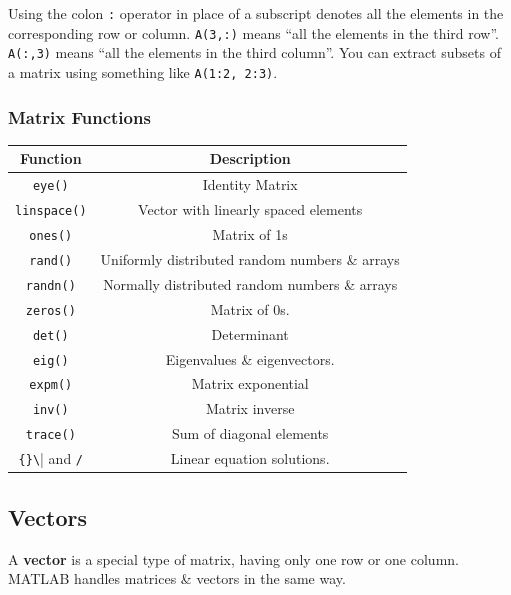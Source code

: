 \documentclass[11pt]{article}
\begin{document}
Using the colon \verb|:| operator in place of a subscript denotes all the elements in the corresponding row or column. 
\verb|A(3,:)| means ``all the elements in the third row''. 
\verb|A(:,3)| means ``all the elements in the third column''. 
You can extract subsets of a matrix using something like \verb|A(1:2, 2:3)|.

\subsubsection{Matrix Functions}
\begin{center} \begin{tabular}{ |c|c| } 
    \hline
    \textbf{Function}   & \textbf{Description}                  \\ 
    \hline
    \verb|eye()|        & Identity Matrix                       \\
    \hline 
    \verb|linspace()|   & Vector with linearly spaced elements  \\
    \hline 
    \verb|ones()|       & Matrix of 1s                                      \\ 
    \hline 
    \verb|rand()|       & Uniformly distributed random numbers \& arrays    \\ 
    \hline 
    \verb|randn()|      & Normally distributed random numbers \& arrays     \\ 
    \hline 
    \verb|zeros()|      & Matrix of 0s.     \\ 
    \hline 
    \verb|det()|        & Determinant       \\ 
    \hline 
    \verb|eig()|        & Eigenvalues \& eigenvectors. \\
    \hline 
    \verb|expm()|       & Matrix exponential \\
    \hline 
    \verb|inv()|        & Matrix inverse    \\ 
    \hline 
    \verb|trace()|      & Sum of diagonal elements \\ 
    \hline 
    \verb|{}\| and \verb|/| & Linear equation solutions. \\
    \hline
\end{tabular}
\end{center}


\subsection{Vectors} 
A \textbf{vector} is a special type of matrix, having only one row or one column. 
MATLAB handles matrices \& vectors in the same way. 
\end{document}
